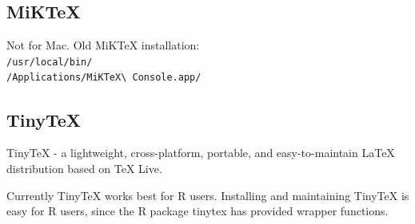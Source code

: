 \documentclass[letterpaper]{article}
\begin{document}
\subsection{MiKTeX}

Not for Mac. Old MiKTeX installation:\\
\verb+/usr/local/bin/+\\
\verb+/Applications/MiKTeX\ Console.app/+

\subsection{TinyTeX}

TinyTeX - a lightweight, cross-platform, portable, and 
easy-to-maintain \LaTeX{} distribution based on TeX Live. 

Currently TinyTeX works best for R users. Installing and 
maintaining TinyTeX is easy for R users, since the R package 
tinytex has provided wrapper functions.
\end{document}
